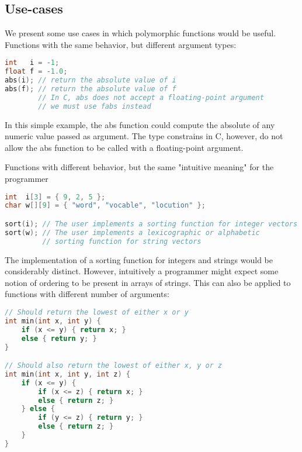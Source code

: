 \subsection{Use-cases}
We present some use cases in which polymorphic functions would be useful. Functions with the same behavior, but different argument types:

\begin{lstlisting}[language=C]
int   i = -1;
float f = -1.0;
abs(i); // return the absolute value of i
abs(f); // return the absolute value of f
        // In C, abs does not accept a floating-point argument
        // we must use fabs instead
\end{lstlisting}

In this simple example, the abs function could compute the absolute of any numeric value passed as argument. The type constrains in C, however, do not allow the abs function to be called with a floating-point argument.

Functions with different behavior, but the same "intuitive meaning" for the programmer

\begin{lstlisting}[language=C]
int  i[3] = { 9, 2, 5 };
char w[][9] = { "word", "vocable", "locution" };

sort(i); // The user implements a sorting function for integer vectors
sort(w); // The user implements a lexicographic or alphabetic
         // sorting function for string vectors
\end{lstlisting}

The implementation of a sorting function for integers and strings would be considerably distinct. However, intuitively a programmer might expect some notion of ordering to be present in arrays of strings. This can also be applied to functions with different number of arguments:

\begin{lstlisting}[language=C]
// Should return the lowest of either x or y
int min(int x, int y) {
	if (x <= y) { return x; }
	else { return y; }
}

// Should also return the lowest of either x, y or z
int min(int x, int y, int z) {
	if (x <= y) {
		if (x <= z) { return x; }
		else { return z; }
	} else {
		if (y <= z) { return y; }
		else { return z; }
	}
}
\end{lstlisting}

